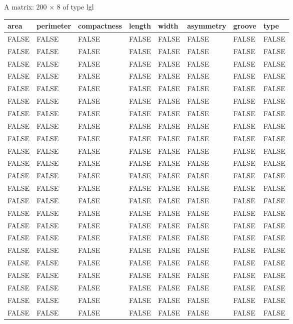 \documentclass[11pt]{article}
\begin{document}
    A matrix: 200 × 8 of type lgl
\begin{tabular}{llllllll}
 area & perimeter & compactness & length & width & asymmetry & groove & type\\
\hline
	 FALSE & FALSE & FALSE & FALSE & FALSE & FALSE & FALSE & FALSE\\
	 FALSE & FALSE & FALSE & FALSE & FALSE & FALSE & FALSE & FALSE\\
	 FALSE & FALSE & FALSE & FALSE & FALSE & FALSE & FALSE & FALSE\\
	 FALSE & FALSE & FALSE & FALSE & FALSE & FALSE & FALSE & FALSE\\
	 FALSE & FALSE & FALSE & FALSE & FALSE & FALSE & FALSE & FALSE\\
	 FALSE & FALSE & FALSE & FALSE & FALSE & FALSE & FALSE & FALSE\\
	 FALSE & FALSE & FALSE & FALSE & FALSE & FALSE & FALSE & FALSE\\
	 FALSE & FALSE & FALSE & FALSE & FALSE & FALSE & FALSE & FALSE\\
	 FALSE & FALSE & FALSE & FALSE & FALSE & FALSE & FALSE & FALSE\\
	 FALSE & FALSE & FALSE & FALSE & FALSE & FALSE & FALSE & FALSE\\
	 FALSE & FALSE & FALSE & FALSE & FALSE & FALSE & FALSE & FALSE\\
	 FALSE & FALSE & FALSE & FALSE & FALSE & FALSE & FALSE & FALSE\\
	 FALSE & FALSE & FALSE & FALSE & FALSE & FALSE & FALSE & FALSE\\
	 FALSE & FALSE & FALSE & FALSE & FALSE & FALSE & FALSE & FALSE\\
	 FALSE & FALSE & FALSE & FALSE & FALSE & FALSE & FALSE & FALSE\\
	 FALSE & FALSE & FALSE & FALSE & FALSE & FALSE & FALSE & FALSE\\
	 FALSE & FALSE & FALSE & FALSE & FALSE & FALSE & FALSE & FALSE\\
	 FALSE & FALSE & FALSE & FALSE & FALSE & FALSE & FALSE & FALSE\\
	 FALSE & FALSE & FALSE & FALSE & FALSE & FALSE & FALSE & FALSE\\
	 FALSE & FALSE & FALSE & FALSE & FALSE & FALSE & FALSE & FALSE\\
	 FALSE & FALSE & FALSE & FALSE & FALSE & FALSE & FALSE & FALSE\\
	 FALSE & FALSE & FALSE & FALSE & FALSE & FALSE & FALSE & FALSE\\
	 FALSE & FALSE & FALSE & FALSE & FALSE & FALSE & FALSE & FALSE\\

\end{tabular}
\end{document}
